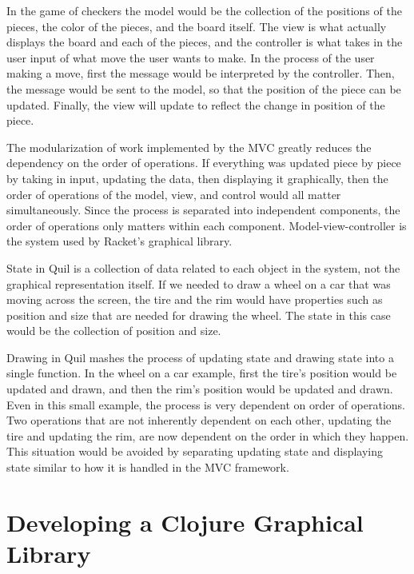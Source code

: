 \documentclass[12pt]{article}
\begin{document}
In the game of checkers the model would be the collection of the positions of the pieces, the color of the pieces, and the board itself. The view is what actually displays the board and each of the pieces, and the controller is what takes in the user input of what move the user wants to make. In the process of the user making a move, first the message would be interpreted by the controller. Then, the message would be sent to the model, so that the position of the piece can be updated. Finally, the view will update to reflect the change in position of the piece.

The modularization of work implemented by the MVC greatly reduces the dependency on the order of operations. If everything was updated piece by piece by taking in input, updating the data, then displaying it graphically, then the order of operations of the model, view, and control would all matter simultaneously. Since the process is separated into independent components, the order of operations only matters within each component. Model-view-controller is the system used by Racket's graphical library.

State in Quil is a collection of data related to each object in the system, not the graphical representation itself. If we needed to draw a wheel on a car that was moving across the screen, the tire and the rim would have properties such as position and size that are needed for drawing the wheel. The state in this case would be the collection of position and size.

Drawing in Quil mashes the process of updating state and drawing state into a single function. In the wheel on a car example, first the tire's position would be updated and drawn, and then the rim's position would be updated and drawn. Even in this small example, the process is very dependent on order of operations. Two operations that are not inherently dependent on each other, updating the tire and updating the rim, are now dependent on the order in which they happen. This situation would be avoided by separating updating state and displaying state similar to how it is handled in the MVC framework.

\section{Developing a Clojure Graphical Library}\label{sec:library}
\end{document}
